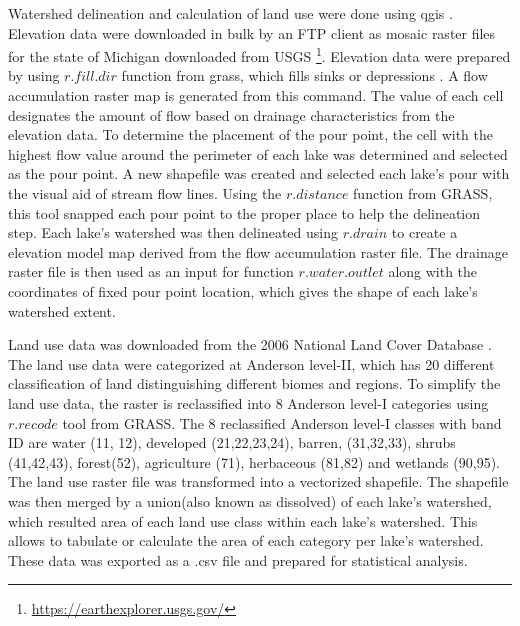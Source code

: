Watershed delineation and calculation of land use were done using \gls{qgis} \cite{qgis_development_team_qgis_2009}.
Elevation data were downloaded in bulk by an FTP client as mosaic raster files for the state of Michigan downloaded from USGS \footnote{\url{https://earthexplorer.usgs.gov/}}.
Elevation data were  prepared by using $r.fill.dir$ function from \gls{grass}, which fills sinks or depressions \cite{grass_development_team_geographic_2017}. A flow accumulation raster map is generated from this command. The value of each cell designates the amount of flow based on drainage characteristics from the elevation data. To determine the placement of the pour point, the cell with the highest flow value around the perimeter of each lake was determined and selected as the pour point. A new shapefile was created and selected each lake's pour with the visual aid of stream flow lines. Using the $r.distance$ function from GRASS, this tool snapped each pour point to the proper place to help the delineation step. Each lake's watershed was then delineated using $r.drain$ to create a elevation model map derived from the flow accumulation raster file. The drainage raster file is then used as an input for function $r.water.outlet$ along with the coordinates of fixed pour point location, which gives the shape of each lake's watershed extent.

Land use data was downloaded from the 2006 National Land Cover Database \cite{homer_development_2004}. The land use data were categorized at Anderson level-II, which has 20 different classification of land distinguishing different biomes and regions.  To simplify the land use data, the raster is reclassified into 8 Anderson level-I categories using $r.recode$ tool from GRASS. The 8 reclassified Anderson level-I classes with band ID are water (11, 12), developed (21,22,23,24), barren, (31,32,33), shrubs (41,42,43), forest(52), agriculture (71), herbaceous (81,82) and wetlands (90,95). The land use raster file was transformed into a vectorized shapefile. The shapefile was then merged by a union(also known as dissolved) of each lake's watershed, which resulted area of each land use class within each lake's watershed. This allows to tabulate or calculate the area of each category per lake's watershed. These data was exported as a .csv file and prepared for statistical analysis.

